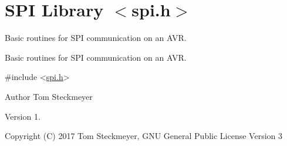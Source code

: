\hypertarget{group__tstec__spi}{}\section{S\+PI Library $<$spi.\+h$>$}
\label{group__tstec__spi}


Basic routines for S\+PI communication on an A\+VR.  


Basic routines for S\+PI communication on an A\+VR. 


\begin{DoxyCode}
\textcolor{preprocessor}{#include <\hyperlink{spi_8h}{spi.h}>} 
\end{DoxyCode}


\begin{DoxyAuthor}{Author}
Tom Steckmeyer
\end{DoxyAuthor}
\begin{DoxyVersion}{Version}
1.
\end{DoxyVersion}
\begin{DoxyCopyright}{Copyright}
(C) 2017 Tom Steckmeyer, G\+NU General Public License Version 3 
\end{DoxyCopyright}
